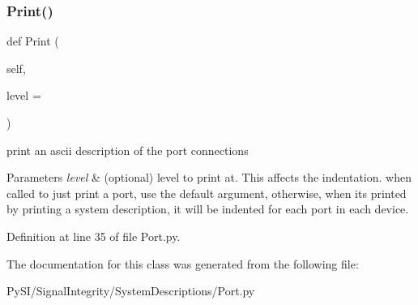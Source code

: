 \subsubsection{\texorpdfstring{Print()}{Print()}}
{\footnotesize\ttfamily def Print (\begin{DoxyParamCaption}\item[{}]{self,  }\item[{}]{level = {} }\end{DoxyParamCaption})}



print an ascii description of the port connections 


\begin{DoxyParams}{Parameters}
{\em level} & (optional) level to print at. This affects the indentation. when called to just print a port, use the default argument, otherwise, when it\textquotesingle{}s printed by printing a system description, it will be indented for each port in each device. \\
\hline
\end{DoxyParams}


Definition at line 35 of file Port.\+py.



The documentation for this class was generated from the following file\+:\begin{DoxyCompactItemize}
\item 
Py\+S\+I/\+Signal\+Integrity/\+System\+Descriptions/Port.\+py\end{DoxyCompactItemize}
